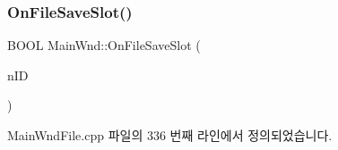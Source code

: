 \mbox{\label{class_main_wnd_aa10e0e321035d0cd1e1e953529df5f19}} 
\subsubsection{\texorpdfstring{On\+File\+Save\+Slot()}{OnFileSaveSlot()}}
{\footnotesize\ttfamily B\+O\+OL Main\+Wnd\+::\+On\+File\+Save\+Slot (\begin{DoxyParamCaption}\item[{U\+I\+NT}]{n\+ID }\end{DoxyParamCaption})\hspace{0.3cm}{\ttfamily [protected]}}



Main\+Wnd\+File.\+cpp 파일의 336 번째 라인에서 정의되었습니다.



